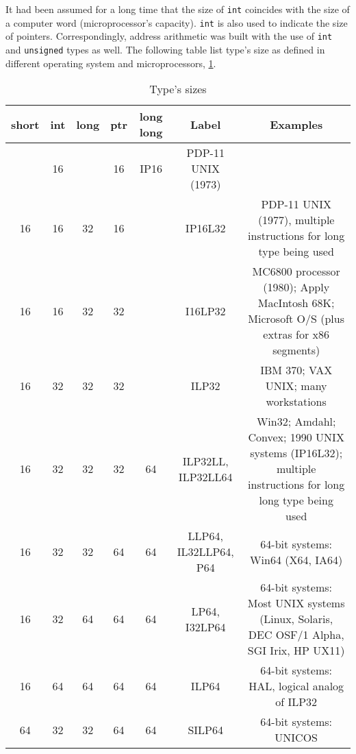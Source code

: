 It had been assumed for a long time that the size of \verb!int! coincides with the size
of a computer word (microprocessor's capacity).  \verb!int! is also used to indicate the size of pointers.
Correspondingly, address arithmetic was built with the use of \verb!int! and \verb!unsigned! types as well.
The following table list type's size as defined in different operating system and microprocessors, \ref{tab:type-size-C++}.

\begin{table}[hbt]
\begin{center}
\caption{Type's sizes} 
\begin{tabular}{ccccccc} 
  \hline
short & int & long & ptr & long long & Label & Examples \\
  \hline\hline
 & 16 &  & 16 & IP16 & PDP-11 UNIX (1973) \\
 16 & 16 & 32 & 16 & & IP16L32 & PDP-11 UNIX (1977), multiple instructions for long type being used \\
 16 & 16 & 32 & 32 & & I16LP32 & MC6800 processor (1980); Apply MacIntosh 68K; Microsoft O/S (plus extras for x86 segments) \\
 16 & 32 & 32 & 32 & & ILP32  & IBM 370; VAX UNIX; many workstations \\
 16 & 32 & 32 & 32 & 64 & ILP32LL, ILP32LL64 & Win32; Amdahl; Convex; 1990 UNIX systems (IP16L32); multiple instructions for long long type being used \\
 16 & 32 & 32 & 64 & 64 & LLP64, IL32LLP64, P64 & 64-bit systems: Win64 (X64, IA64) \\
 16 & 32 & 64 & 64 & 64 & LP64, I32LP64 & 64-bit systems: Most UNIX systems (Linux, Solaris, DEC OSF/1 Alpha, SGI Irix, HP UX11) \\
 16 & 64 & 64 & 64 & 64 & ILP64  & 64-bit systems: HAL, logical analog of ILP32 \\
 64 & 32 & 32 & 64 & 64 & SILP64 & 64-bit systems: UNICOS 
\end{tabular}
\end{center}
\label{tab:type-size-C++}
\end{table}

